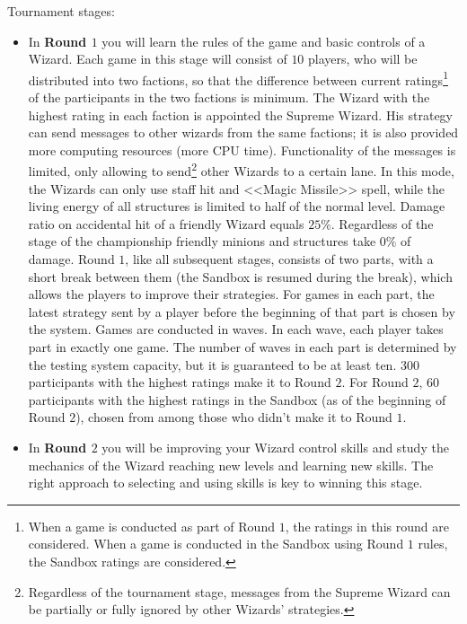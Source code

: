 Tournament stages:
\begin{itemize}
 \item In \textbf{Round $1$} you will learn the rules of the game and basic controls of a Wizard. Each game in this stage
            will consist of $10$ players, who will be distributed into two factions, so that the difference between current
            ratings\footnote[1]{When a game is conducted as part of Round $1$, the ratings in this round are considered. When a game is conducted in the Sandbox using
            Round $1$ rules, the Sandbox ratings are considered.} of the participants in the two factions is minimum. The Wizard with the highest rating in each
            faction is appointed the Supreme Wizard. His strategy can send messages to other wizards from the same factions; it is also
            provided more computing resources (more CPU time). Functionality of the messages is limited, only allowing
            to send\footnote[2]{Regardless of the tournament stage, messages from the Supreme Wizard can be partially or fully
            ignored by other Wizards’ strategies.} other Wizards to a certain lane. In this mode, the Wizards can only use
            staff hit and <<Magic Missile>> spell, while the living energy of all structures is limited to half of
            the normal level. Damage ratio on accidental hit of a friendly Wizard equals $25\%$. Regardless of the stage
            of the championship friendly minions and structures take $0\%$ of damage. Round $1$, like all subsequent stages, consists of
            two parts, with a short break between them (the Sandbox is resumed during the break), which allows the players to improve their strategies.
            For games in each part, the latest strategy sent by a player before the beginning of that part is chosen by the system. Games are conducted in waves. In each
            wave, each player takes part in exactly one game. The number of waves in each part is determined by the testing system capacity, but it is
            guaranteed to be at least ten. $300$ participants with the highest ratings make it to Round $2$. For Round $2$,
            $60$ participants with the highest ratings in the Sandbox (as of the beginning of Round $2$), chosen from among those who didn’t make it to
            Round $1$.
 \item In \textbf{Round $2$} you will be improving your Wizard control skills and study the mechanics of the Wizard reaching
            new levels and learning new skills. The right approach to selecting and using skills is key to winning this stage.

\end{itemize}
